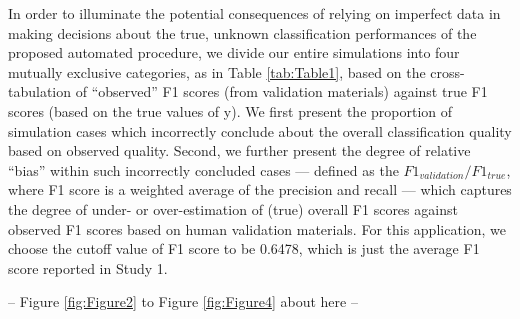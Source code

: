 \documentclass[man, 12pt, a4paper, nolmodern, noextraspace]{apa6}
\begin{document}
In order to illuminate the potential consequences of relying on imperfect data in making decisions about the true, unknown classification performances of the proposed automated procedure, we divide our entire simulations into four mutually exclusive categories, as in Table \ref{tab:Table1}, based on the cross-tabulation of \enquote{observed} F1 scores (from validation materials) against true F1 scores (based on the true values of y). We first present the proportion of simulation cases which incorrectly conclude about the overall classification quality based on observed quality. Second, we further present the degree of relative \enquote{bias} within such incorrectly concluded cases --- defined as the $ F1_{validation}/F1_{true} $, where F1 score is a weighted average of the precision and recall --- which captures the degree of under- or over-estimation of (true) overall F1 scores against observed F1 scores based on human validation materials. For this application, we choose the cutoff value of F1 score to be 0.6478, which is just the average F1 score reported in Study 1.
\centerline{ -- Figure \ref{fig:Figure2} to Figure \ref{fig:Figure4} about here -- }    
\end{document}
